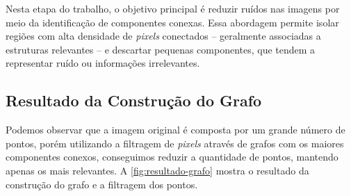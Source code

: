 
 Nesta etapa do trabalho, o objetivo principal é reduzir ruídos nas imagens por meio da identificação de componentes conexas. Essa abordagem permite isolar regiões com alta densidade de \textit{pixels} conectados -- geralmente associadas a estruturas relevantes -- e descartar pequenas componentes, que tendem a representar ruído ou informações irrelevantes.


\subsection{Resultado da Construção do Grafo}
\label{sec:resultado-construcao-grafo}

Podemos observar que a imagem original é composta por um grande número de pontos, porém utilizando a filtragem de \textit{pixels} através de grafos com os maiores componentes conexos, conseguimos reduzir a quantidade de pontos, mantendo apenas os mais relevantes. A \autoref{fig:resultado-grafo} mostra o resultado da construção do grafo e a filtragem dos pontos.

